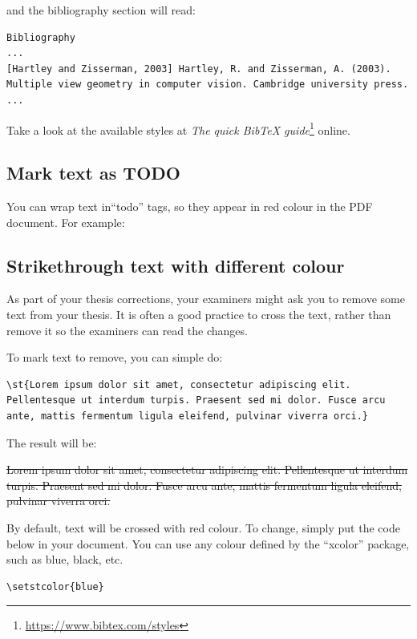\noindent and the bibliography section will read:


\begin{lstlisting}[style=custom-text]
Bibliography
...
[Hartley and Zisserman, 2003] Hartley, R. and Zisserman, A. (2003). Multiple view geometry in computer vision. Cambridge university press.
...
\end{lstlisting}

Take a look at the available styles at \textit{The quick BibTeX guide}\footnote{\url{https://www.bibtex.com/styles}} online.


\subsection{Mark text as TODO}


You can wrap text in``todo'' tags, so they appear in red colour in the PDF document. For example:


\subsection{Strikethrough text with different colour}


As part of your thesis corrections, your examiners might ask you to remove some text from your thesis. It is often a good practice to cross the text, rather than remove it so the examiners can read the changes.

To mark text to remove, you can simple do:

\begin{lstlisting}[style=custom-latex]
\st{Lorem ipsum dolor sit amet, consectetur adipiscing elit. Pellentesque ut interdum turpis. Praesent sed mi dolor. Fusce arcu ante, mattis fermentum ligula eleifend, pulvinar viverra orci.}
\end{lstlisting}

The result will be:


\st{Lorem ipsum dolor sit amet, consectetur adipiscing elit. Pellentesque ut interdum turpis. Praesent sed mi dolor. Fusce arcu ante, mattis fermentum ligula eleifend, pulvinar viverra orci.}

By default, text will be crossed with red colour. To change, simply put the code below in your document. You can use any colour defined by the ``xcolor'' package, such as blue, black, etc.

\begin{lstlisting}[style=custom-latex]
\setstcolor{blue}
\end{lstlisting}



